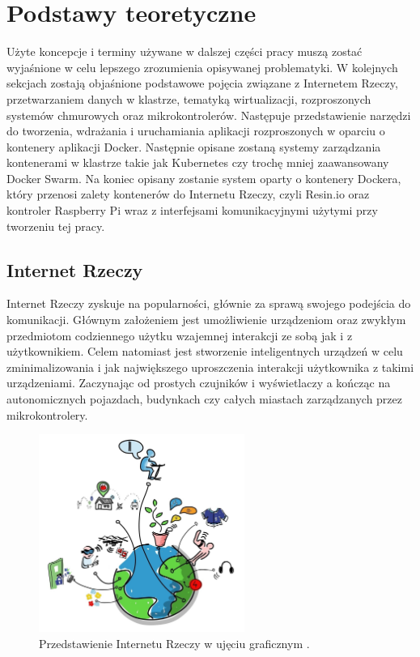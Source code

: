 \documentclass[12pt]{report}
\let\Oldsection\section
\renewcommand{\section}{\FloatBarrier\Oldsection}
\begin{document}
\chapter{Podstawy teoretyczne}\label{chap:background}
Użyte koncepcje i terminy używane w dalszej części pracy muszą zostać wyjaśnione w celu lepszego zrozumienia opisywanej problematyki. W kolejnych sekcjach zostają objaśnione podstawowe pojęcia związane z Internetem Rzeczy, przetwarzaniem danych w klastrze, tematyką wirtualizacji, rozproszonych systemów chmurowych oraz mikrokontrolerów. Następuje przedstawienie narzędzi do tworzenia, wdrażania i uruchamiania aplikacji rozproszonych w oparciu o kontenery aplikacji Docker. Następnie opisane zostaną systemy zarządzania kontenerami w klastrze takie jak Kubernetes czy trochę mniej zaawansowany Docker Swarm. Na koniec opisany zostanie system oparty o kontenery Dockera, który przenosi zalety kontenerów do Internetu Rzeczy, czyli Resin.io oraz kontroler Raspberry Pi wraz z interfejsami komunikacyjnymi użytymi przy tworzeniu tej pracy.

\section{Internet Rzeczy}
Internet Rzeczy zyskuje na popularności, głównie za sprawą swojego podejścia do komunikacji. Głównym założeniem jest umożliwienie urządzeniom oraz zwykłym przedmiotom codziennego użytku wzajemnej interakcji ze sobą jak i z użytkownikiem. Celem natomiast jest stworzenie inteligentnych urządzeń w celu zminimalizowania i jak największego uproszczenia interakcji użytkownika z takimi urządzeniami. Zaczynając od prostych czujników i wyświetlaczy a kończąc na autonomicznych pojazdach, budynkach czy całych miastach zarządzanych przez mikrokontrolery. 

\begin{figure}[h]
	\centering
	\includegraphics[width=0.6\textwidth]{images/iot.jpg}
	\caption{Przedstawienie Internetu Rzeczy w ujęciu graficznym \cite{iotImg}.}
\end{figure}
\end{document}
